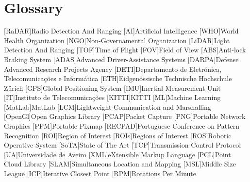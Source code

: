 \chapter{Glossary}

\footnotesize
\SingleSpacing

\begin{multicols}{2} 
\begin{acronym}[AAAAAA]
	[RaDAR]{Radio Detection And Ranging}
	[AI]{Artificial Intelligence}
	[WHO]{World Health Organization}
	[NGO]{Non-Governamental Organization} 
	[LiDAR]{Light Detection And Ranging}
	[TOF]{Time of Flight} 
	[FOV]{Field of View}
	[ABS]{Anti-lock Braking System}
	[ADAS]{Advanced Driver-Assistance Systems}
	[DARPA]{Defense Advanced Research Projects Agency}
	[DETI]{Departamento de Eletrónica, Telecomunicações e Informática}
	[ETH]{Eidgenössische Technische Hochschule Zürich}
	[GPS]{Global Positioning System}
	[IMU]{Inertial Measurement Unit}
	[IT]{Instituto de Telecomunicações}
	[KITTI]{KITTI}
	[ML]{Machine Learning}
	[MatLab\textsuperscript{\tiny\textregistered}]{MatLab\textsuperscript{\tiny\textregistered}}
	[LCM]{Lightweight Communication and Marshalling}
	[OpenGl]{Open Graphics Library}
	[PCAP]{Packet Capture}
	[PNG]{Portable Network Graphics}
	[PPM]{Portable Pixmap}
	[RECPAD]{Portuguese Conference on Pattern Recognition}
	[ROI]{Region of Interest}
	[ROIs]{Regions of Interest}
	[ROS]{Robotic Operative System} 
	[SoTA]{State of The Art}
	[TCP]{Transmission Control Protocol}
	[UA]{Universidade de Aveiro}
	[XML]{eXtensible Markup Language}
	[PCL]{Point Cloud Library}
	[SLAM]{Simultaneous Location and Mapping} 
	[MSL]{Middle Size League}
	[ICP]{Iterative Closest Point}
	[RPM]{Rotations Per Minute}
\end{acronym}
\end{multicols}

